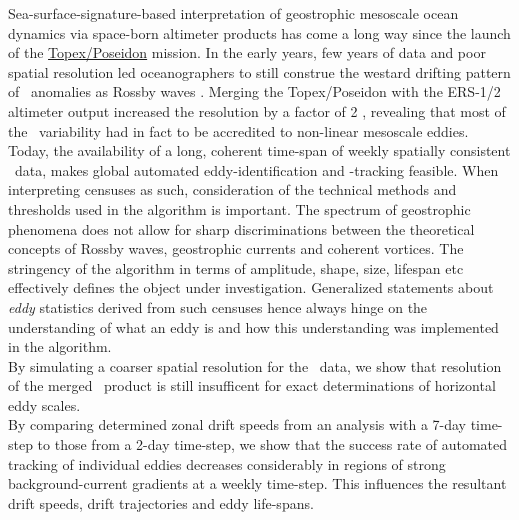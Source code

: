 Sea-surface-signature-based interpretation of geostrophic mesoscale ocean dynamics via space-born altimeter products has come a long way since the launch of the \href{http://en.wikipedia.org/wiki/TOPEX/Poseidon}{Topex/Poseidon} mission. In the early years, few years of data and poor spatial resolution led oceanographers to still construe the westard drifting pattern of \SSH~anomalies as Rossby waves \citep{le1993sea,Killworth1997a}.
Merging the Topex/Poseidon with the ERS-1/2 altimeter output increased the resolution by a factor of 2 \citep{Chelton2007}, revealing that most of the \SSH~variability had in fact to be accredited to non-linear mesoscale eddies. Today, the availability of a long, coherent time-span of weekly spatially consistent \SSH~data, makes global automated eddy-identification and -tracking feasible.
When interpreting censuses as such, consideration of the technical methods and thresholds used in the algorithm is important. The spectrum of geostrophic phenomena does not allow for sharp discriminations between the theoretical concepts of Rossby waves, geostrophic currents and coherent vortices.
The stringency of the algorithm in terms of amplitude, shape, size, lifespan etc effectively defines the object under investigation. Generalized statements about \textit{eddy} statistics derived from such censuses hence always hinge on the understanding of what an eddy is and how this understanding was implemented in the algorithm.\\
By simulating a coarser spatial resolution for the \pop~data, we show that resolution of the merged \avi~product is still insufficent for exact determinations of horizontal eddy scales.\\
By comparing determined zonal drift speeds from an analysis with a 7-day time-step to those from a 2-day time-step, we show that the success rate of automated tracking of individual eddies decreases considerably in regions of strong background-current gradients at a weekly time-step. This influences the resultant drift speeds, drift trajectories and eddy life-spans. 
